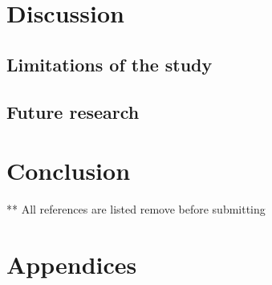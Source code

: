 \documentclass{master_thesis}
\begin{document}
\section{Discussion}
	\subsection{Limitations of the study}
	\subsection{Future research}
\section*{Conclusion}

\printbibliography
** All references are listed remove before submitting
\section*{Appendices}
\listoffigures
{}

\end{document}
